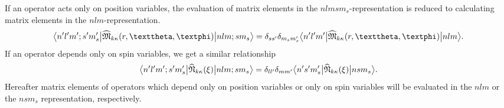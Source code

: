 If an operator acts only on position variables, the evaluation of matrix elements in the \(nlmsm_{s}\)-representation is reduced to calculating matrix elements in the \(nlm\)-representation.
\begin{equation}
\braOket{ n^{\prime} l^{\prime} m^{\prime} ; s^{\prime} m_{s}^{\prime}}{ \widehat{\mathfrak{M}}_{k \kappa}(r, \vartheta, \varphi)}{n l m ; s m_{s}}=\delta_{s s^{\prime}} \delta_{m_{s} m_{s}^{\prime}}
\braOket{ n^{\prime} l^{\prime} m^{\prime}}{ \widehat{\mathfrak{M}}_{k \kappa}(r, \vartheta, \varphi)}{n l m} . \label{eq:13:2:3}
\end{equation}
If an operator depends only on spin variables, we get a similar relationship
\begin{equation}
\bigl\langle  n^{\prime} l^{\prime} m^{\prime} ; s^{\prime} m_{s}^{\prime} \big|  \widehat{\mathfrak{N}}_{k \kappa}(\xi) \big| n l m ; s m_{s} \bigr\rangle=\delta_{l l^{\prime}} \delta_{m m^{\prime}}
\bigl\langle  n^{\prime} s^{\prime} m_{s}^{\prime} \big|  \widehat{\mathfrak{N}}_{k \kappa}(\xi) \big| n s m_{s} \bigr\rangle. \label{eq:13:2:4}
\end{equation}
Hereafter matrix elements of operators which depend only on position variables or only on spin variables will be evaluated in the \(n l m\)  or the \(n s m_{s}\) representation, respectively.

